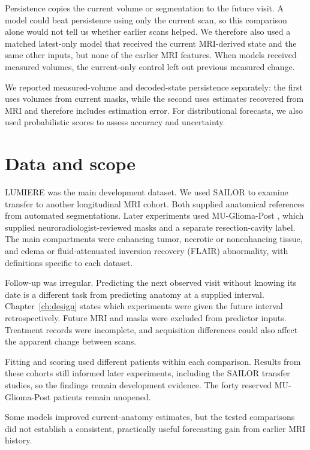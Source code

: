 Persistence copies the current volume or segmentation to the future visit. A model could beat persistence using only the current scan, so this comparison alone would not tell us whether earlier scans helped. We therefore also used a matched latest-only model that received the current MRI-derived state and the same other inputs, but none of the earlier MRI features. When models received measured volumes, the current-only control left out previous measured change.

We reported measured-volume and decoded-state persistence separately: the first uses volumes from current masks, while the second uses estimates recovered from MRI and therefore includes estimation error. For distributional forecasts, we also used probabilistic scores to assess accuracy and uncertainty.

\section{Data and scope}

LUMIERE \cite{ref4} was the main development dataset. We used SAILOR \cite{ref18} to examine transfer to another longitudinal MRI cohort. Both supplied anatomical references from automated segmentations. Later experiments used MU-Glioma-Post \cite{ref19}, which supplied neuroradiologist-reviewed masks and a separate resection-cavity label. The main compartments were enhancing tumor, necrotic or nonenhancing tissue, and edema or fluid-attenuated inversion recovery (FLAIR) abnormality, with definitions specific to each dataset.

Follow-up was irregular. Predicting the next observed visit without knowing its date is a different task from predicting anatomy at a supplied interval. Chapter~\ref{ch:design} states which experiments were given the future interval retrospectively. Future MRI and masks were excluded from predictor inputs. Treatment records were incomplete, and acquisition differences could also affect the apparent change between scans.

Fitting and scoring used different patients within each comparison. Results from these cohorts still informed later experiments, including the SAILOR transfer studies, so the findings remain development evidence. The forty reserved MU-Glioma-Post patients remain unopened.

Some models improved current-anatomy estimates, but the tested comparisons did not establish a consistent, practically useful forecasting gain from earlier MRI history.


